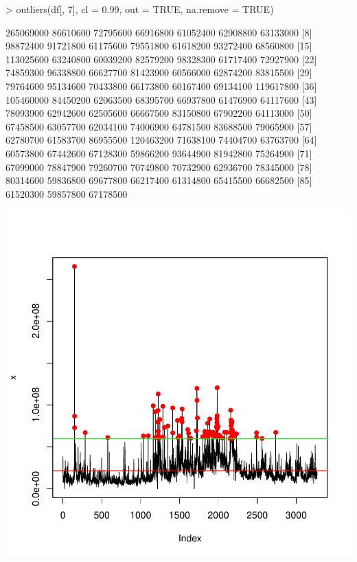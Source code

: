 \documentclass{article}
\begin{document}
\begin{Schunk}
\begin{Sinput}
> outliers(df[, 7], cl = 0.99, out = TRUE, na.remove = TRUE)
\end{Sinput}
\begin{Soutput}
 [1] 265069000  86610600  72795600  66916800  61052400  62908800  63133000
 [8]  98872400  91721800  61175600  79551800  61618200  93272400  68560800
[15] 113025600  63240800  60039200  82579200  98328300  61717400  72927900
[22]  74859300  96338800  66627700  81423900  60566000  62874200  83815500
[29]  79764600  95134600  70433800  66173800  60167400  69134100 119617800
[36] 105460000  84450200  62063500  68395700  66937800  61476900  64117600
[43]  78093900  62942600  62505600  66667500  83150800  67902200  64113000
[50]  67458500  63057700  62034100  74006900  64781500  83688500  79065900
[57]  62780700  61583700  86955500 120463200  71638100  74404700  63763700
[64]  60573800  67442600  67128300  59866200  93644900  81942800  75264900
[71]  67099000  78847900  79260700  70749800  70732900  62936700  78345000
[78]  80314600  59836800  69677800  66217400  61314800  65415500  66682500
[85]  61520300  59857800  67178500
\end{Soutput}
\end{Schunk}
\includegraphics{anadetect-014}
\end{document}
